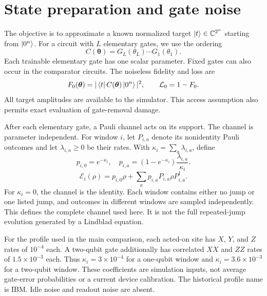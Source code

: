 \section{State preparation and gate noise}
\label{sec:problem}

The objective is to approximate a known normalized target
$\ket{t}\in\mathbb C^{2^n}$ starting from $\ket{0^n}$.
For a circuit with $L$ elementary gates, we use the ordering
\begin{equation}
 C(\boldsymbol\theta)=G_L(\theta_L)\cdots G_1(\theta_1).
 \label{eq:circuit}
\end{equation}
Each trainable elementary gate has one scalar parameter. Fixed gates can
also occur in the comparator circuits. The noiseless fidelity and loss are
\begin{equation}
 F_0(\boldsymbol\theta)=
 |\bra{t}C(\boldsymbol\theta)\ket{0^n}|^2,
 \qquad \mathcal L_0=1-F_0.
 \label{eq:ideal_fidelity}
\end{equation}
All target amplitudes are available to the simulator. This access assumption
also permits exact evaluation of gate-removal damage.

After each elementary gate, a Pauli channel acts on its support. The channel
is parameter independent. For window $i$, let $P_{i,a}$ denote its nonidentity Pauli
outcomes and let $\lambda_{i,a}\geq0$ be their rates. With
$\kappa_i=\sum_a\lambda_{i,a}$, define
\begin{equation}
 p_{i,0}=e^{-\kappa_i},\quad
 p_{i,a}=(1-e^{-\kappa_i})\frac{\lambda_{i,a}}{\kappa_i}.
 \label{eq:jump_law}
\end{equation}
\begin{equation}
 \mathcal E_i(\rho)=p_{i,0}\rho+
 \sum_a p_{i,a}P_{i,a}\rho P_{i,a}^{\dagger}.
 \label{eq:channel}
\end{equation}
For $\kappa_i=0$, the channel is the identity. Each window contains either
no jump or one listed jump, and outcomes in different windows are sampled
independently. This defines the complete channel used here. It is not the
full repeated-jump evolution generated by a Lindblad equation.

For the profile used in the main comparison, each acted-on site has $X$,
$Y$, and $Z$ rates of $10^{-4}$ each. A two-qubit gate additionally has
correlated $XX$ and $ZZ$ rates of $1.5\times10^{-3}$ each. Thus
$\kappa_i=3\times10^{-4}$ for a one-qubit window and
$\kappa_i=3.6\times10^{-3}$ for a two-qubit window.
These coefficients are simulation inputs, not average gate-error
probabilities or a current device calibration. The historical profile name
is IBM. Idle noise and readout noise are absent.

